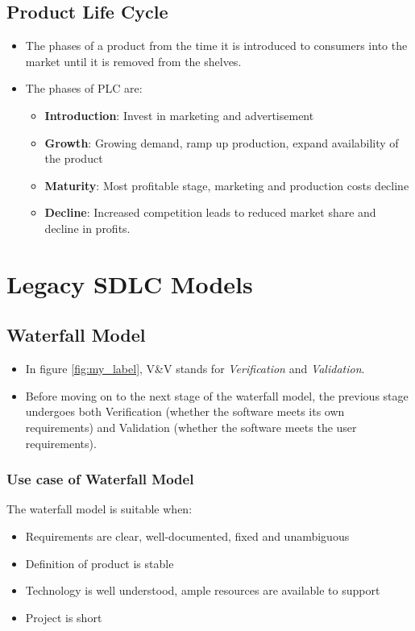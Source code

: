 \documentclass{article}
\begin{document}
\subsection{Product Life Cycle}
\begin{itemize}
    \item The phases of a product from the time it is introduced to consumers into the market until it is removed from the shelves.
    
    \item The phases of  PLC are:
    \begin{itemize}
        \item \textbf{Introduction}: Invest in marketing and advertisement
        
        \item \textbf{Growth}: Growing demand, ramp up production, expand availability of the product
        
        \item \textbf{Maturity}: Most profitable stage, marketing and production costs decline
        
        \item \textbf{Decline}: Increased competition leads to reduced market share and decline in profits.
    \end{itemize}
\end{itemize}

\section{Legacy SDLC Models}

\subsection{Waterfall Model}
\begin{itemize}
    \item In figure \ref{fig:my_label}, V\&V stands for \textit{Verification} and \textit{Validation}.
    
    \item Before moving on to the next stage of the waterfall model, the previous stage undergoes both Verification (whether the software meets its own requirements) and Validation (whether the software meets the user requirements). 
\end{itemize}

\subsubsection{Use case of Waterfall Model}
The waterfall model is suitable when:
\begin{itemize}
    \item Requirements are clear, well-documented, fixed and unambiguous
    
    \item Definition of product is stable
    
    \item Technology is well understood, ample resources are available to support 
    
    \item Project is short
\end{itemize}
\end{document}
